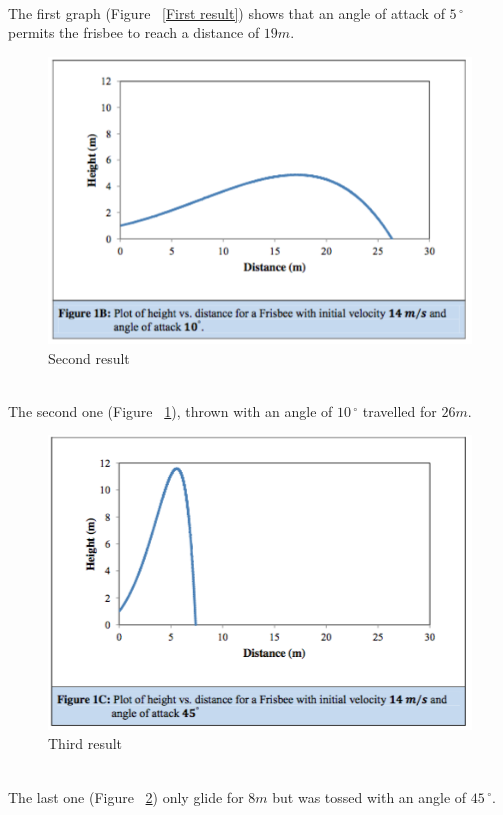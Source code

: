\documentclass[10pt,a4paper]{report}
\begin{document}
\leavevmode
\\The first graph (Figure ~\ref{First result}) shows that an angle of attack of $5\,^{\circ}$ permits the frisbee to reach a distance of $19m$.
\begin{figure}[H]
\centering
\includegraphics[scale=0.6]{graph2.jpg}
\caption{Second result}
\label{Second result}
\end{figure}
\leavevmode
\\The second one (Figure ~\ref{Second result}), thrown with an angle of $10\,^{\circ}$ travelled for $26m$.
\begin{figure}[H]
\centering
\includegraphics[scale=0.6]{graph3.jpg}
\caption{Third result}
\label{Third result}
\end{figure}
\leavevmode
\\The last one (Figure ~\ref{Third result}) only glide for $8m$ but was tossed with an angle of $45\,^{\circ} $.
\end{document}
